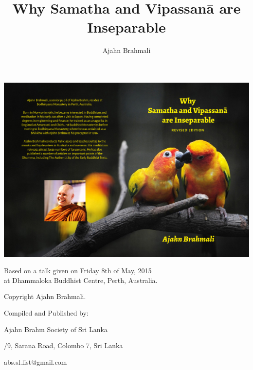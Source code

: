 \documentclass[12pt,openany]{book}
\title{Why Samatha and Vipassanā are \protect\\ Inseparable}
\author{Ajahn Brahmali}
\date{}
\begin{document}
\frontmatter
\pagestyle{empty}

\hspace*{-156mm}
\includegraphics{sv-2_a5_cover}

\begin{center}\end{center}
\begin{center}

\vfill

\maketitle

\vfill
\end{center}

\newpage
\restoregeometry

\begin{center}\end{center}

\vspace{4em}
{\small
\noindent Based on a talk given on Friday 8th of May, 2015 \\at Dhammaloka Buddhist Centre, Perth, Australia.

\bigskip

\noindent Copyright Ajahn Brahmali.
\bigskip

\noindent Compiled and Published by:

\medskip

\noindent Ajahn Brahm Society of Sri Lanka

/9, Sarana Road, Colombo 7, Sri Lanka

\noindent abs.sl.list@gmail.com

}
\end{document}
